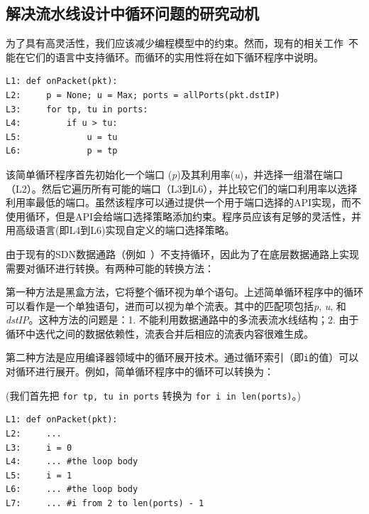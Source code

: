 \documentclass{ctexart}
\newcommand{\codeword}[1]{\texttt{\small{#1}}}
\begin{document}
\subsection{解决流水线设计中循环问题的研究动机}
为了具有高灵活性，我们应该减少编程模型中的约束。然而，现有的相关工作~\cite{snap,sivaraman2016packet}不能在它们的语言中支持循环。而循环的实用性将在如下循环程序中说明。

\begin{small}
\begin{verbatim}
L1: def onPacket(pkt):
L2:     p = None; u = Max; ports = allPorts(pkt.dstIP)
L3:     for tp, tu in ports:
L4:         if u > tu:
L5:             u = tu
L6:             p = tp
\end{verbatim}
\end{small}

该简单循环程序首先初始化一个端口 (\emph{p})及其利用率(\emph{u})，并选择一组潜在端口（L2）。然后它遍历所有可能的端口（L3到L6），并比较它们的端口利用率以选择利用率最低的端口。虽然该程序可以通过提供一个用于端口选择的API实现，而不使用循环，但是API会给端口选择策略添加约束。程序员应该有足够的灵活性，并用高级语言(即L4到L6)实现自定义的端口选择策略。 

由于现有的SDN数据通路（例如~\cite{ofdpa}）不支持循环，因此为了在底层数据通路上实现需要对循环进行转换。有两种可能的转换方法：

第一种方法是黑盒方法，它将整个循环视为单个语句。上述简单循环程序中的循环可以看作是一个单独语句，进而可以视为单个流表。其中的匹配项包括\emph{p}, \emph{u}, 和 \emph{dstIP}。这种方法的问题是：1. 不能利用数据通路中的多流表流水线结构；2. 由于循环中迭代之间的数据依赖性，流表合并后相应的流表内容很难生成。

第二种方法是应用编译器领域中的循环展开技术。通过循环索引（即\codeword{i}的值）可以对循环进行展开。例如，简单循环程序中的循环可以转换为：

(我们首先把 \codeword{for tp, tu in ports} 转换为 \codeword{for i in len(ports)}。)

\begin{small}
\begin{verbatim}
L1: def onPacket(pkt):
L2:     ... 
L3:     i = 0
L4:     ... #the loop body
L5:     i = 1
L6:     ... #the loop body
L7:     ... #i from 2 to len(ports) - 1
\end{verbatim}
\end{small}
\end{document}
